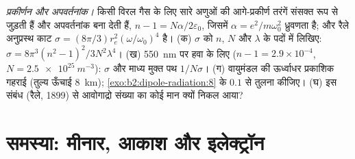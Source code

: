\begin{exercise}[$\star\star\star$]\label{exo:b2:dipole-radiation:12}
\emph{प्रकीर्णन और अपवर्तनांक।} किसी विरल गैस के लिए सारे अणुओं की
आगे-प्रकीर्ण तरंगें संसक्त रूप से जुड़ती हैं और अपवर्तनांक बना देती हैं,
$n - 1 = N\alpha/2\varepsilon_0$, जिसमें $\alpha = e^2/m\omega_0^2$ ध्रुवणता है; और
रैले अनुप्रस्थ काट $\sigma = (8\pi/3)r_e^2(\omega/\omega_0)^4$ है। (क)
$\sigma$ को $n$, $N$ और $\lambda$ के पदों में लिखिए: $\sigma = 8\pi^3(n^2 - 1)^2/3N^2\lambda^4$। (ख)
\qty{550}{nm} पर हवा के लिए ($n - 1 = 2.9 \times 10^{-4}$, $N = \qty{2.5e25}{m^{-3}}$):
$\sigma$ और माध्य मुक्त पथ $1/N\sigma$। (ग) वायुमंडल की ऊर्ध्वाधर प्रकाशिक गहराई
(तुल्य ऊँचाई \qty{8}{km}); \cref{exo:b2:dipole-radiation:8} के $0.1$ से तुलना
कीजिए। (घ) इस संबंध (रैले,
1899) से आवोगाद्रो संख्या का कोई मान क्यों निकल आया?
\end{exercise}

\section{समस्या: मीनार, आकाश और इलेक्ट्रॉन}

